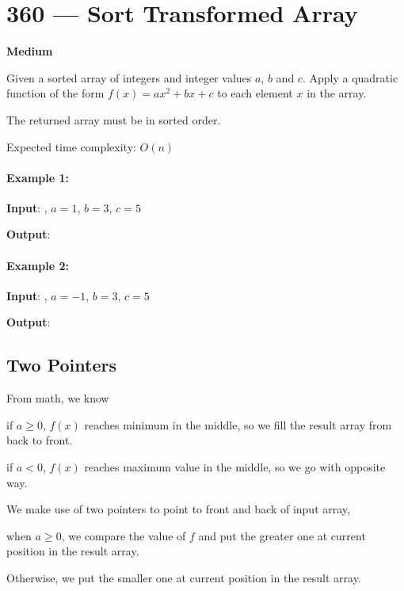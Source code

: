 \section{360 --- Sort Transformed Array}

\textbf{Medium}

Given a sorted array of integers  and integer values $a$, $b$ and $c$. Apply a quadratic function of the form $f(x) = ax^2 + bx + c$ to each element $x$ in the array.

The returned array must be in sorted order.

Expected time complexity: $O(n)$

\paragraph{Example 1:}

\begin{flushleft}
\textbf{Input}: , $a = 1$, $b = 3$, $c = 5$

\textbf{Output}: \fcj{[3,9,15,33]}
\end{flushleft}

\paragraph{Example 2:}

\begin{flushleft}
\textbf{Input}: , $ a = -1 $, $ b = 3 $, $ c = 5 $

\textbf{Output}: \fcj{[-23,-5,1,7]}
\end{flushleft}

\subsection{Two Pointers}
From math, we know 

if $a \geq 0$, $f(x)$ reaches minimum in the middle, so we fill the result array from back to front. 

if $a < 0$, $f(x)$ reaches maximum value in the middle, so we go with opposite way.

We make use of two pointers to point to front and back of input array, 

when $a\geq 0$, we compare the value of $f$ and put the greater one at current position in the result array.

Otherwise, we put the smaller one at current position in the result array.

